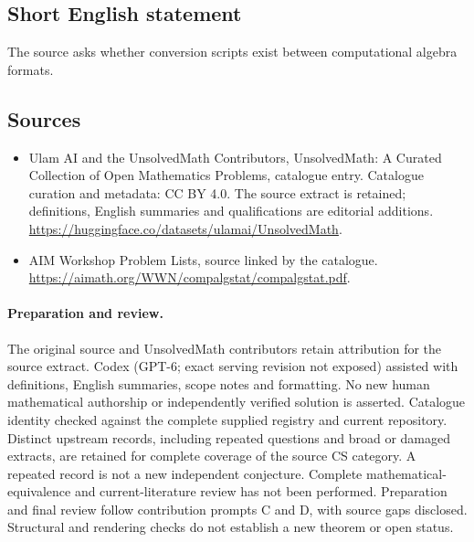 \documentclass[11pt]{article}
\begin{document}
\subsection{Short English statement}
The source asks whether conversion scripts exist between computational algebra formats.
\subsection{Sources}
\begin{itemize}
\item[\hypertarget{source:statement:1}{S1}] Ulam AI and the UnsolvedMath Contributors, UnsolvedMath: A Curated Collection of Open Mathematics Problems, catalogue entry. Catalogue curation and metadata: CC BY 4.0. The source extract is retained; definitions, English summaries and qualifications are editorial additions.
\url{https://huggingface.co/datasets/ulamai/UnsolvedMath}.
\item[\hypertarget{source:statement:2}{S2}] AIM Workshop Problem Lists, source linked by the catalogue.
\url{https://aimath.org/WWN/compalgstat/compalgstat.pdf}.
\end{itemize}
\paragraph{Preparation and review.}
The original source and UnsolvedMath contributors retain attribution for the source extract. Codex (GPT-6; exact serving revision not exposed) assisted with definitions, English summaries, scope notes and formatting. No new human mathematical authorship or independently verified solution is asserted. Catalogue identity checked against the complete supplied registry and current repository. Distinct upstream records, including repeated questions and broad or damaged extracts, are retained for complete coverage of the source CS category. A repeated record is not a new independent conjecture. Complete mathematical-equivalence and current-literature review has not been performed. Preparation and final review follow contribution prompts C and D, with source gaps disclosed. Structural and rendering checks do not establish a new theorem or open status.
\label{end:statement}
\end{document}
